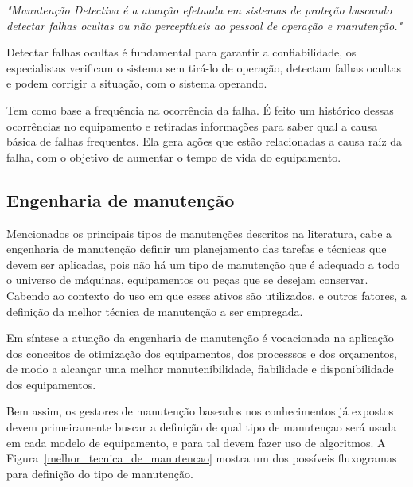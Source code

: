 		\emph{"Manutenção Detectiva é a atuação efetuada em sistemas de proteção buscando detectar falhas ocultas ou não perceptíveis ao pessoal de operação e manutenção."} \cite{kardecnascif2010}

		Detectar falhas ocultas é fundamental para garantir a confiabilidade, os especialistas verificam o sistema sem tirá-lo de operação, detectam falhas ocultas e podem corrigir a situação, com o sistema operando.

		Tem como base a frequência na ocorrência da falha. É feito um histórico dessas ocorrências no equipamento e retiradas informações para saber qual a causa básica de falhas frequentes. Ela gera ações que estão relacionadas a causa raíz da falha, com o objetivo de aumentar o tempo de vida do equipamento.

\subsection{Engenharia de manutenção}

Mencionados os principais tipos de manutenções descritos na literatura, cabe a engenharia de manutenção definir um planejamento das tarefas e técnicas que devem ser aplicadas, pois não há um tipo de manutenção que é adequado a todo o universo de máquinas, equipamentos ou peças que se desejam conservar. Cabendo ao contexto do uso em que esses ativos são utilizados, e outros fatores, a definição da melhor técnica de manutenção a ser empregada.

Em síntese a atuação da engenharia de manutenção é vocacionada na aplicação dos conceitos de otimização dos equipamentos, dos processsos e dos orçamentos, de modo a alcançar uma melhor manutenibilidade, fiabilidade e disponibilidade dos equipamentos. 

Bem assim, os gestores de manutenção baseados nos conhecimentos já expostos devem primeiramente buscar a definição de qual tipo de manutençao será usada em cada modelo de equipamento, e para tal devem fazer uso de algoritmos. A Figura~\ref{melhor_tecnica_de_manutencao} mostra um dos possíveis fluxogramas para definição do tipo de manutenção.

